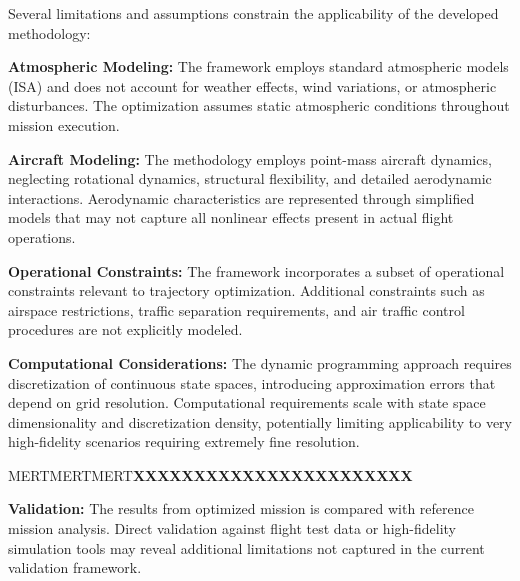 Several limitations and assumptions constrain the applicability of the developed methodology:

\textbf{Atmospheric Modeling:} The framework employs standard atmospheric models (ISA) and does not account for weather effects, wind variations, or atmospheric disturbances. The optimization assumes static atmospheric conditions throughout mission execution.

\textbf{Aircraft Modeling:} The methodology employs point-mass aircraft dynamics, neglecting rotational dynamics, structural flexibility, and detailed aerodynamic interactions. Aerodynamic characteristics are represented through simplified models that may not capture all nonlinear effects present in actual flight operations.

\textbf{Operational Constraints:} The framework incorporates a subset of operational constraints relevant to trajectory optimization. Additional constraints such as airspace restrictions, traffic separation requirements, and air traffic control procedures are not explicitly modeled.

\textbf{Computational Considerations:} The dynamic programming approach requires discretization of continuous state spaces, introducing approximation errors that depend on grid resolution. Computational requirements scale with state space dimensionality and discretization density, potentially limiting applicability to very high-fidelity scenarios requiring extremely fine resolution.

MERTMERTMERT\textbf{XXXXXXXXXXXXXXXXXXXXXXX}


\textbf{Validation:} The results from optimized mission is compared with reference mission analysis. Direct validation against flight test data or high-fidelity simulation tools may reveal additional limitations not captured in the current validation framework.

